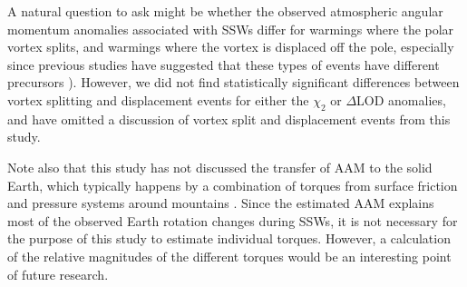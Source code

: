 \documentclass[draft,jgrga]{agutex}
\begin{document}
\begin{article}
 {A natural question to ask might be whether the observed atmospheric angular momentum anomalies associated with SSWs differ for warmings where the polar vortex splits, and warmings where the vortex is displaced off the pole, especially since previous studies have suggested that these types of events have different precursors} \citep{martiusetal2009}).  
 {However, we did not find statistically significant differences between vortex splitting and displacement events for either the $\chi_2$ or $\Delta$LOD anomalies, and have omitted a discussion of vortex split and displacement events from this study.  }


Note also that this study has not discussed the transfer of AAM to the solid Earth, which typically happens by a combination of torques from surface friction and  {pressure systems around} mountains \citep{Egger2007}. 
Since the estimated AAM explains most of the observed Earth rotation changes during SSWs, it is not necessary for the purpose of this study to estimate individual torques.  
However, a calculation of the relative magnitudes of the different torques would be an interesting point of future research.  


% 




%
%
%
%
%


\end{article}
\end{document}
